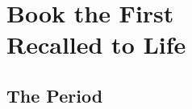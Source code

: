 %
%







% 
% 
% 
% 
% 
% 
% 
% 
% 
% 





\part{Book the First\\Recalled to Life}



\chapter{The Period}


